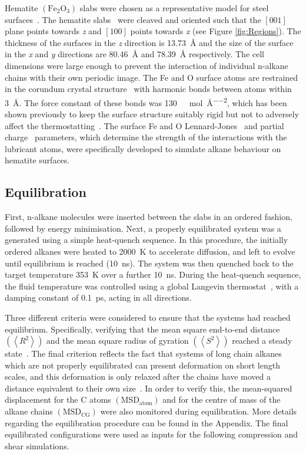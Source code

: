 \documentclass[5p]{elsarticle}
\begin{document}
Hematite $\left(\text{Fe}_2\text{O}_3\right)$ slabs were chosen as a representative model for steel surfaces~\cite{Oh1998}. The hematite  slabs~\cite{Maslen1994} were cleaved and oriented such that the $\left[001\right]$ plane points towards \emph{z} and $\left[100\right]$ points towards \emph{x} (see Figure \ref{fig:Regions}). The thickness of the surfaces in the \emph{z} direction is \SI{13.73}{\angstrom} and the size of the surface in the \emph{x} and \emph{y} directions are \SI{80.46}{\angstrom} and \SI{78.39}{\angstrom} respectively. The cell dimensions were large enough to prevent the interaction of individual n-alkane chains with their own periodic image. The Fe and O surface atoms are restrained in the corundum crystal structure~\cite{Maslen1994} with harmonic bonds between atoms within \SI{3}{\angstrom}. The force constant of these bonds was  \SI{130}{\kilo\calorie\per\mol\per\angstrom\squared}, which has been shown previously to keep the surface structure suitably rigid but not to adversely affect the thermostatting~\cite{Berro2010}. The surface Fe and O Lennard-Jones~\cite{Savio2012} and partial charge~\cite{Berro2010} parameters, which determine the strength of the interactions with the lubricant atoms, were specifically developed to simulate alkane behaviour on hematite surfaces.

\subsection{Equilibration}

First, n-alkane molecules were inserted between the slabs in an ordered fashion, followed by energy minimisation. Next, a properly equilibrated system was a generated using a simple heat-quench sequence. In this procedure, the initially ordered alkanes were heated to \SI{2000}{\kelvin} to accelerate diffusion, and left to evolve until equilibrium is reached (\SI{10}{\nano\second}). The system was then quenched back to the target temperature \SI{353}{\kelvin} over a further \SI{10}{\nano\second}. During the heat-quench sequence, the fluid temperature was controlled using a global Langevin thermostat~\cite{Schneider1978}, with a damping constant of \SI{0.1}{\pico\second}, acting in all directions.

Three different criteria were considered to ensure that the systems had reached equilibrium. Specifically, verifying that the mean square end-to-end distance $\left(\left< R^2 \right> \right)$ and the mean square radius of gyration $\left(\left< S^2 \right> \right)$ reached a steady state~\cite{Brown1994}. The final criterion reflects the fact that systems of long chain alkanes which are not properly equilibrated can present  deformation  on  short  length  scales,  and  this  deformation is only relaxed after the chains have moved a distance equivalent to their own size~\cite{Auhl2003}. In order to verify this, the mean-squared displacement for the C atoms $\left(\text{MSD}_{\text{atom}}\right)$ and for the centre of mass of the alkane chains $\left(\text{MSD}_{\text{CG}}\right)$ were also monitored during equilibration. More details regarding the equilibration procedure can be found in the Appendix. The final equilibrated configurations were used as inputs for the following compression and shear simulations. 
\end{document}
